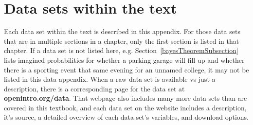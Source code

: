 \chapter{Data sets within the text}
\label{appendix_data}
\label{data_appendix}


\newcommand{\datawrap}[1]{#1 $\to$}
\newcommand{\seedataappendix}[1]{This data set
    is described in Data Appendix~\ref{#1}.}
\newcommand{\seedataappendixplural}[1]{These data sets
    are described in Data Appendix~\ref{#1}.}
\newcommand{\madeup}{This example was made up.}


Each data set within the text is described in this appendix.
For those data sets that are in multiple sections in a chapter,
only the first section is listed in that chapter.
If a data set is not listed here, e.g. Section~\ref{bayesTheoremSubsection}
lists imagined probabilities for whether a parking garage will
fill up and whether there is a sporting event that same evening
for an unnamed college, it may not be listed in this data appendix.
When a raw data set is available vs just a description,
there is a corresponding page for the data set at
    {\color{black}\textbf{openintro.org/data}}.
That webpage also includes many more data sets than are
covered in this textbook,
and each data set on the website includes a description,
it's source, a detailed overview of each data set's variables,
and download options.




